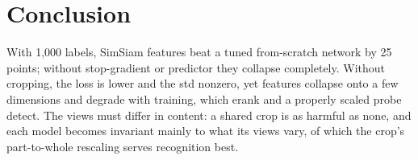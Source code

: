 \documentclass[10pt,twocolumn,letterpaper]{article}
\begin{document}
\section{Conclusion}
\label{sec:conclusion}
With 1,000 labels, SimSiam features beat a tuned from-scratch network by 25 points; without stop-gradient or predictor they collapse completely.
Without cropping, the loss is lower and the std nonzero, yet features collapse onto a few dimensions and degrade with training, which erank and a properly scaled probe detect.
The views must differ in content: a shared crop is as harmful as none, and each model becomes invariant mainly to what its views vary, of which the crop's part-to-whole rescaling serves recognition best.

{
    \small
    
    
}
\end{document}
